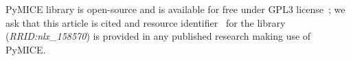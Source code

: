 PyMICE library is open-source and is available for free 
under GPL3 license~\cite{gpl}; we ask that this article is cited and resource
identifier~\cite{ozyurt2016} for the library (\emph{RRID:nlx\_158570}) is provided 
in any published research making use of PyMICE.
